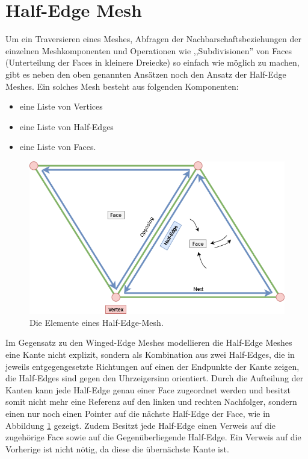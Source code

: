 \section{Half-Edge Mesh}
Um ein Traversieren eines Meshes, Abfragen der Nachbarschaftsbeziehungen der einzelnen Meshkomponenten und Operationen wie ,,Subdivisionen'' von Faces (Unterteilung der Faces in kleinere Dreiecke) so einfach wie m\"oglich zu machen, gibt es neben den oben genannten Ans\"atzen noch den Ansatz der Half-Edge Meshes. Ein solches Mesh besteht aus folgenden Komponenten:
\begin{itemize}
	\item eine Liste von Vertices
	\item eine Liste von Half-Edges
	\item eine Liste von Faces.
\end{itemize}

\begin{figure}[h]
	\centering
	\includegraphics[width=0.7\linewidth]{Images/half-edge-mesh}
	\caption[Half-Edge-Mesh Schematik]{Die Elemente eines Half-Edge-Mesh.}
	\label{fig:half-edge-mesh}
\end{figure}

Im Gegensatz zu den Winged-Edge Meshes modellieren die Half-Edge Meshes eine Kante nicht explizit, sondern als Kombination aus zwei Half-Edges, die in jeweils entgegengesetzte Richtungen auf einen der Endpunkte der Kante zeigen, die Half-Edges sind gegen den Uhrzeigersinn orientiert. Durch die Aufteilung der Kanten kann jede Half-Edge genau einer Face zugeordnet werden und besitzt somit nicht mehr eine Referenz auf den linken und rechten Nachfolger, sondern einen nur noch einen Pointer auf die n\"achste Half-Edge der Face, wie in Abbildung \ref{fig:half-edge-mesh} gezeigt. Zudem Besitzt jede Half-Edge einen Verweis auf die zugeh\"orige Face sowie auf die Gegen\"uberliegende Half-Edge. Ein Verweis auf die Vorherige ist nicht n\"otig, da diese die \"ubern\"achste Kante ist. 

